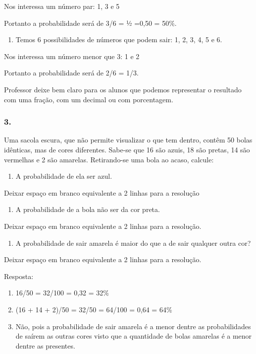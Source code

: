 Nos interessa um número par: 1, 3 e 5

Portanto a probabilidade será de 3/6 = ½ =0,50 = 50\%.

\begin{enumerate}
\def\labelenumi{\alph{enumi})}
\item
  Temos 6 possibilidades de números que podem sair: 1, 2, 3, 4, 5 e 6.
\end{enumerate}

Nos interessa um número menor que 3: 1 e 2

Portanto a probabilidade será de 2/6 = 1/3.

Professor deixe bem claro para os alunos que podemos representar o
resultado com uma fração, com um decimal ou com porcentagem.

\subsubsection{3.}\label{section-80}

Uma sacola escura, que não permite visualizar o que tem dentro, contêm
50 bolas idênticas, mas de cores diferentes. Sabe-se que 16 são azuis,
18 são pretas, 14 são vermelhas e 2 são amarelas. Retirando-se uma bola
ao acaso, calcule:

\begin{enumerate}
\def\labelenumi{\alph{enumi})}
\item
  A probabilidade de ela ser azul.
\end{enumerate}

Deixar espaço em branco equivalente a 2 linhas para a resolução

\begin{enumerate}
\def\labelenumi{\alph{enumi})}
\item
  A probabilidade de a bola não ser da cor preta.
\end{enumerate}

Deixar espaço em branco equivalente a 2 linhas para a resolução.

\begin{enumerate}
\def\labelenumi{\alph{enumi})}
\item
  A probabilidade de sair amarela é maior do que a de sair qualquer
  outra cor?
\end{enumerate}

Deixar espaço em branco equivalente a 2 linhas para a resolução.

Resposta:

\begin{enumerate}
\def\labelenumi{\alph{enumi})}
\item
  16/50 = 32/100 = 0,32 = 32\%
\item
  (16 + 14 + 2)/50 = 32/50 = 64/100 = 0,64 = 64\%
\item
  Não, pois a probabilidade de sair amarela é a menor dentre as
  probabilidades de saírem as outras cores visto que a quantidade de
  bolas amarelas é a menor dentre as presentes.
\end{enumerate}

